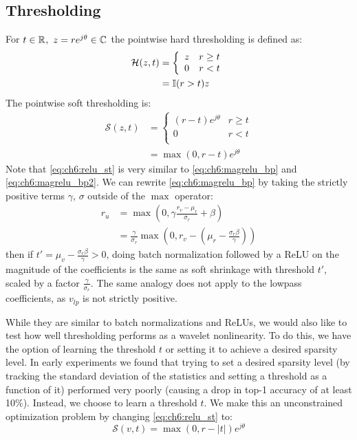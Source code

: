 \subsection{Thresholding}
For $t \in \mathbb{R}^{},\ z = re^{j\theta} \in \mathbb{C}^{}$ the pointwise hard thresholding is defined as:
\begin{align}
  \mathcal{H}(z, t) &= \left\{ \begin{array}{ll}
    z & r \geq t \\
    0 & r < t\\
  \end{array} \right. \\
  &= \mathbb{I}(r > t) z
\end{align}
The pointwise soft thresholding is:
\begin{align}
  \mathcal{S}(z, t) &= \left\{ \begin{array}{ll}
    (r-t)e^{j\theta} & r \geq t \\
    0 & r < t\\
  \end{array} \right. \\
  &= \max(0, r - t)e^{j\theta} \label{eq:ch6:relu_st}
\end{align}
Note that \eqref{eq:ch6:relu_st} is very similar to \eqref{eq:ch6:magrelu_bp} and \eqref{eq:ch6:magrelu_bp2}.
We can rewrite \eqref{eq:ch6:magrelu_bp} by taking the strictly positive terms
$\gamma$, $\sigma$ outside of the $\max$ operator:
\begin{align}
  r_u &= \max(0, \gamma \frac{r_v-\mu_r}{\sigma_r} + \beta) \\
      &= \frac{\gamma}{\sigma_r}\max\left(0, r_v - \left(\mu_r - \frac{\sigma_r\beta}{\gamma}\right)\right) 
\end{align}
then if $t' = \mu_v - \frac{\sigma_r\beta}{\gamma} > 0$, doing batch
normalization followed by a ReLU on the magnitude of the coefficients is the
same as soft shrinkage with threshold $t'$, scaled by a factor
$\frac{\gamma}{\sigma_r}$.  
The same analogy does not apply to the lowpass
coefficients, as $v_{lp}$ is not strictly positive. 

While they are similar to batch normalizations and ReLUs, we would also like 
to test how well thresholding performs as a wavelet nonlinearity.
To do this, we have the option of learning the threshold $t$ or setting it to achieve a
desired sparsity level. In early experiments we found that trying to set a
desired sparsity level (by tracking the standard deviation of the statistics
and setting a threshold as a function of it) performed very poorly (causing a
drop in top-1 accuracy of at least 10\%).
Instead, we choose to learn a threshold $t$. We make this an unconstrained
optimization problem by changing \eqref{eq:ch6:relu_st} to:
\begin{equation}
  \mathcal{S}(v, t) = \max(0, r-|t|)e^{j\theta}  \label{eq:ch6:relu_st2}
\end{equation}

